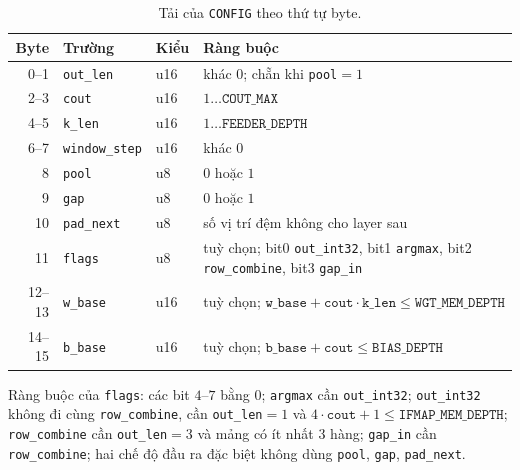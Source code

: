\begin{table}[H]\centering
\caption{Tải của \texttt{CONFIG} theo thứ tự byte.}\label{tab:pl-config}
\footnotesize\setlength{\tabcolsep}{4pt}
\begin{tabular}{@{}rll>{\raggedright\arraybackslash}p{9cm}@{}}
\toprule
Byte & Trường & Kiểu & Ràng buộc \\ \midrule
0--1 & \texttt{out\_len} & u16 & khác $0$; chẵn khi \texttt{pool}$=1$ \\
2--3 & \texttt{cout} & u16 & $1\ldots\texttt{COUT\_MAX}$ \\
4--5 & \texttt{k\_len} & u16 & $1\ldots\texttt{FEEDER\_DEPTH}$ \\
6--7 & \texttt{window\_step} & u16 & khác $0$ \\
8 & \texttt{pool} & u8 & $0$ hoặc $1$ \\
9 & \texttt{gap} & u8 & $0$ hoặc $1$ \\
10 & \texttt{pad\_next} & u8 & số vị trí đệm không cho layer sau \\
11 & \texttt{flags} & u8 & tuỳ chọn; bit0 \texttt{out\_int32}, bit1 \texttt{argmax}, bit2 \texttt{row\_combine}, bit3 \texttt{gap\_in} \\
12--13 & \texttt{w\_base} & u16 & tuỳ chọn; $\texttt{w\_base}+\texttt{cout}\cdot\texttt{k\_len}\le\texttt{WGT\_MEM\_DEPTH}$ \\
14--15 & \texttt{b\_base} & u16 & tuỳ chọn; $\texttt{b\_base}+\texttt{cout}\le\texttt{BIAS\_DEPTH}$ \\ \bottomrule
\end{tabular}

\smallskip
\footnotesize Ràng buộc của \texttt{flags}: các bit $4$--$7$ bằng $0$; \texttt{argmax} cần \texttt{out\_int32}; \texttt{out\_int32} không đi cùng \texttt{row\_combine}, cần \texttt{out\_len}$=1$ và $4\cdot\texttt{cout}+1\le\texttt{IFMAP\_MEM\_DEPTH}$; \texttt{row\_combine} cần \texttt{out\_len}$=3$ và mảng có ít nhất $3$ hàng; \texttt{gap\_in} cần \texttt{row\_combine}; hai chế độ đầu ra đặc biệt không dùng \texttt{pool}, \texttt{gap}, \texttt{pad\_next}.
\end{table}

